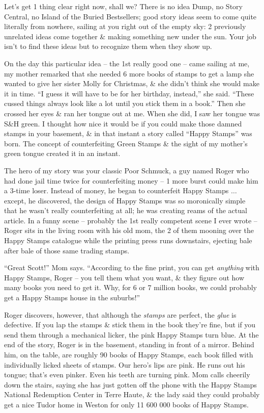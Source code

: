 \documentclass{article}
\numberwithin{equation}{section}
\begin{document}
 Let's get 1 thing clear right now, shall we? There is no idea Dump, no Story Central, no Island of the Buried Bestsellers; good story ideas seem to come quite literally from nowhere, sailing at you right out of the empty sky: 2 previously unrelated ideas come together \& making something new under the sun. Your job isn't to find these ideas but to recognize them when they show up.

On the day this particular idea -- the 1st really good one -- came sailing at me, my mother remarked that she needed 6 more books of stamps to get a lamp she wanted to give her sister Molly for Christmas, \& she didn't think she would make it in time. ``I guess it will have to be for her birthday, instead,'' she said. ``These cussed things always look like a lot until you stick them in a book.'' Then she crossed her eyes \& ran her tongue out at me. When she did, I saw her tongue was S\&H green. I thought how nice it would be if you could make those damned stamps in your basement, \& in that instant a story called ``Happy Stamps'' was born. The concept of counterfeiting Green Stamps \& the sight of my mother's green tongue created it in an instant.

The hero of my story was your classic Poor Schmuck, a guy named Roger who had done jail time twice for counterfeiting money -- 1 more burst could make him a 3-time loser. Instead of money, he began to counterfeit Happy Stamps $\ldots$ except, he discovered, the design of Happy Stamps was so moronically simple that he wasn't really counterfeiting at all; he was creating reams of the actual article. In a funny scene -- probably the 1st really competent scene I ever wrote -- Roger sits in the living room with his old mom, the 2 of them mooning over the Happy Stamps catalogue while the printing press runs downstairs, ejecting bale after bale of those same trading stamps.

``Great Scott!'' Mom says. ``According to the fine print, you can get \textit{anything} with Happy Stamps, Roger -- you tell them what you want, \& they figure out how many books you need to get it. Why, for 6 or 7 million books, we could probably get a Happy Stamps house in the suburbs!''

Roger discovers, however, that although the \textit{stamps} are perfect, the \textit{glue} is defective. If you lap the stamps \& stick them in the book they're fine, but if you send them through a mechanical licker, the pink Happy Stamps turn blue. At the end of the story, Roger is in the basement, standing in front of a mirror. Behind him, on the table, are roughly 90 books of Happy Stamps, each book filled with individually licked sheets of stamps. Our hero's lips are pink. He runs out his tongue; that's even pinker. Even his teeth are turning pink. Mom calls cheerily down the stairs, saying she has just gotten off the phone with the Happy Stamps National Redemption Center in Terre Haute, \& the lady said they could probably get a nice Tudor home in Weston for only 11 600 000 books of Happy Stamps.
\end{document}
